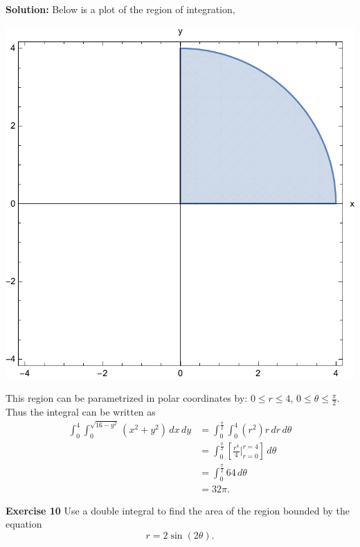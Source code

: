 \documentclass[12pt,oneside]{exam}
\newenvironment{exercise}[1]{\vspace{.1in}\noindent\textbf{Exercise #1 \hspace{.05em}}}{}
\newenvironment{newsolution}{\vspace{.1in}\noindent\textbf{Solution: \hspace{.05em}}}{}
\begin{document}
\begin{newsolution}
Below is a plot of the region of integration, 
\begin{center}
\includegraphics[scale=0.5]{p8.pdf}
\end{center}
This region can be parametrized in polar coordinates by: $0 \leq r \leq 4$, $0 \leq \theta \leq \frac{\pi}{2}$. Thus the integral can be written as 
\begin{align*}
\int_{0}^{4} \int_{0}^{\sqrt{16-y^2}} (x^2+y^2) \, dx \, dy & = \int_{0}^{\frac{\pi}{2}}\int_{0}^{4} (r^2) r\, dr \, d\theta \\
& = \int_{0}^{\frac{\pi}{2}} \left[ \frac{r^4}{4} \Big|_{r=0}^{r=4} \right] \, d\theta \\
& = \int_{0}^{\frac{\pi}{2}} 64 \, d\theta \\
& = 32\pi.
\end{align*}
\end{newsolution}

\begin{exercise}{10} 
Use a double integral to find the area of the region bounded by the equation 
\begin{equation*}
 r= 2\sin(2\theta).
 \end{equation*}
\end{exercise}
\end{document}
